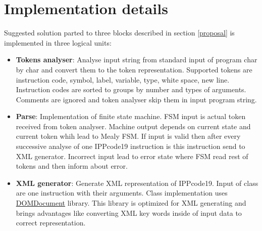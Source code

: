 \documentclass[a4paper, 10pt]{article}
\begin{document}
\section{Implementation details}
Suggested solution parted to three blocks described in section \ref{proposal} is implemented in three logical units:
\begin{itemize}
	\item \textbf{Tokens analyser}: Analyse input string from standard input of program char by char and convert them to the token representation. Supported tokens are instruction code, symbol, label, variable, type, white space, new line. Instruction codes are sorted to groups by number and types of arguments. Comments are ignored and token analyser skip them in input program string.
	\item \textbf{Parse}: Implementation of finite state machine. FSM input is actual token received from token analyser. Machine output depends on current state and current token whih lead to Mealy FSM. If input is valid then after every successive analyse of one IPPcode19 instruction is this instruction send to XML generator. Incorrect input lead to error state where FSM read rest of tokens and then inform about error.
	\item \textbf{XML generator}: Generate XML representation of IPPcode19. Input of class are one instruction with their arguments. Class implementation uses \href{http://php.net/manual/en/class.domdocument.php}{DOMDocument} library. This library is optimized for XML generating and brings advantages like converting XML key words inside of input data to correct representation. 
\end{itemize}
\end{document}
